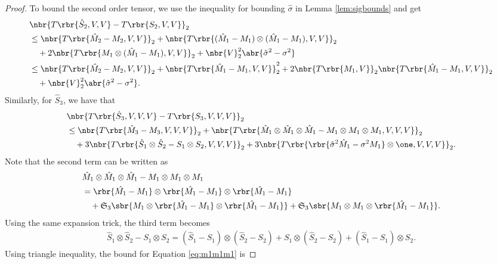 \documentclass[twoside,11pt]{article}
\newcommand{\symm}{\mathfrak{S}}
\begin{document}
{\begin{proof}
To bound the second order tensor, we use the inequality for bounding $\hat{\sigma}$ in Lemma \ref{lem:sigbounds} and get
  \begin{align}
    &\nbr{T\rbr{\hat{S}_2, V,V} - T\rbr{S_2,V,V}}_2 \nonumber \\
    & \leq \nbr{T\rbr{\hat{M}_2 - M_2,V,V}}_2 + \nbr{T\rbr{ (\hat{M}_1 - M_1) \otimes (\hat{M}_1 - M_1) ,V,V} }_2 \\
    &\,\,\,\,\,\,+ 2\nbr{T\rbr{ M_1 \otimes (\hat{M}_1-M_1),V,V} }_2 + \nbr{V}_2^2 \abr{\hat{\sigma}^2 - \sigma^2}\nonumber\\
    & \leq \nbr{T\rbr{\hat{M}_2 - M_2,V,V}}_2 + \nbr{T\rbr{ \hat{M}_1 - M_1 ,V,V} }_2^2 + 2 \nbr{T\rbr{M_1,V}}_2\nbr{T\rbr{ \hat{M}_1 - M_1 ,V,V} }_2 \nonumber\\
    &\,\,\,\,\,\,+ \nbr{V}_2^2 \abr{\hat{\sigma}^2 - \sigma^2} .
  \end{align}
Similarly, for $\hat{S}_3$, we have that
  \begin{align}
    &\nbr{T\rbr{\hat{S}_3, V,V,V} - T\rbr{S_3,V,V,V}}_2 \nonumber\\
    & \leq \nbr{T\rbr{\hat{M}_3-M_3, V,V,V}}_2 + \nbr{ T\rbr{ \hat{M}_1 \otimes \hat{M}_1 \otimes \hat{M}_1 - M_1 \otimes M_1 \otimes M_1,V,V,V} }_2\nonumber\\
    &\,\,\,\,\,\,+3 \nbr{T\rbr{\hat{S}_1\otimes \hat{S}_2-S_1 \otimes S_2, V,V,V} }_2 +3 \nbr{T\rbr{\rbr{\hat{\sigma}^2\hat{M}_1 - \sigma^2M_1} \otimes \one,V,V,V}}_2. 
  \end{align}
  Note that the second term can be written as
  \begin{align}
  \label{eq:m1m1m1}
    &\hat{M}_1 \otimes \hat{M}_1 \otimes \hat{M}_1 - M_1 \otimes M_1 \otimes M_1 \nonumber\\
    &= \rbr{\hat{M_1}-M_1} \otimes \rbr{\hat{M_1}-M_1} \otimes \rbr{\hat{M_1}-M_1}\nonumber \\
    &\,\,\,\,\,\,+ \symm_3 \sbr{ M_1\otimes \rbr{\hat{M_1}-M_1} \otimes \rbr{\hat{M_1}-M_1}} + \symm_3 \sbr{ M_1 \otimes M_1\otimes \rbr{\hat{M_1}-M_1} }.
  \end{align}
Using the same expansion trick, the third term becomes
  \begin{align}
  \label{eq:s2s2}
    \hat{S}_1\otimes \hat{S}_2-S_1 \otimes S_2 = (\hat{S}_1-S_1) \otimes(\hat{S}_2-S_2) + S_1 \otimes(\hat{S}_2-S_2) + (\hat{S}_1-S_1) \otimes S_2.
  \end{align}
Using triangle inequality, the bound for Equation \eqref{eq:m1m1m1} is

\end{proof}}
\end{document}
